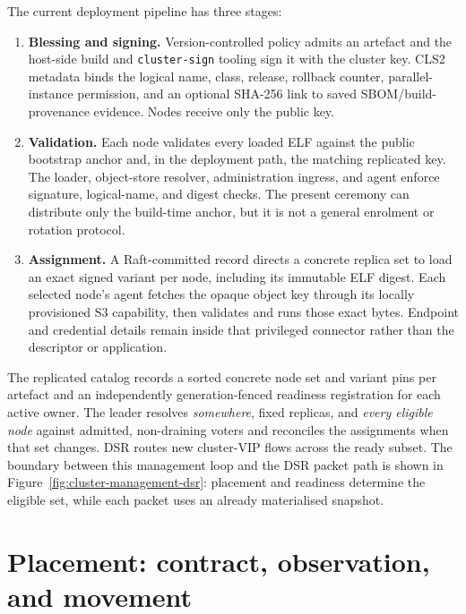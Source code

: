 The current deployment pipeline has three stages:

\begin{enumerate}
    \item \textbf{Blessing and signing.} Version-controlled policy admits an
        artefact and the host-side build and \texttt{cluster-}\allowbreak\texttt{sign} tooling
        sign it with the cluster key. CLS2 metadata binds the logical name,
        class, release, rollback counter, parallel-instance permission, and
        an optional SHA-256 link to saved SBOM/build-provenance evidence.
        Nodes receive only the public key.

    \item \textbf{Validation.} Each node validates every loaded ELF against
        the public bootstrap anchor and, in the deployment path, the matching
        replicated key. The loader, object-store resolver, administration
        ingress, and agent enforce signature, logical-name, and digest checks.
        The present ceremony can distribute only the build-time anchor, but it is
        not a general enrolment or rotation protocol.

    \item \textbf{Assignment.} A Raft-committed record directs a concrete
        replica set to load an exact signed variant per node, including its immutable ELF digest.
        Each selected node's agent fetches the opaque object key through its
        locally provisioned S3 capability, then validates and runs those exact
        bytes. Endpoint and credential details remain inside that privileged
        connector rather than the descriptor or application.
\end{enumerate}

The replicated catalog records a sorted concrete node set and variant pins per
artefact and an independently generation-fenced readiness registration for each
active owner. The leader resolves \emph{somewhere}, fixed replicas, and
\emph{every eligible node} against admitted, non-draining voters and
reconciles the assignments when that set changes. DSR routes new cluster-VIP
flows across the ready subset. The boundary between this management loop and
the DSR packet path is shown in
Figure~\ref{fig:cluster-management-dsr}: placement and readiness determine the
eligible set, while each packet uses an already materialised snapshot.

\section{Placement: contract, observation, and movement}

